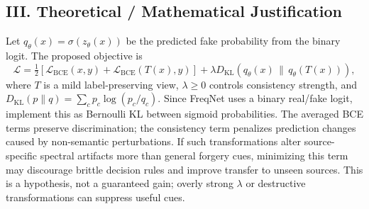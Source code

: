 \documentclass[8pt,a4paper]{article}
\begin{document}
\subsection*{III. Theoretical / Mathematical Justification}
Let $q_\theta(x)=\sigma(z_\theta(x))$ be the predicted fake probability from the binary logit. The proposed objective is
\[
\mathcal{L}=\tfrac{1}{2}\left[\mathcal{L}_{\mathrm{BCE}}(x,y)+\mathcal{L}_{\mathrm{BCE}}(T(x),y)\right]
+\lambda D_{\mathrm{KL}}\!\left(q_\theta(x)\,\|\,q_\theta(T(x))\right),
\]
where $T$ is a mild label-preserving view, $\lambda\geq0$ controls consistency strength, and $D_{\mathrm{KL}}(p\|q)=\sum_c p_c\log(p_c/q_c)$. Since FreqNet uses a binary real/fake logit, implement this as Bernoulli KL between sigmoid probabilities. The averaged BCE terms preserve discrimination; the consistency term penalizes prediction changes caused by non-semantic perturbations. If such transformations alter source-specific spectral artifacts more than general forgery cues, minimizing this term may discourage brittle decision rules and improve transfer to unseen sources. This is a hypothesis, not a guaranteed gain; overly strong $\lambda$ or destructive transformations can suppress useful cues.
\end{document}
